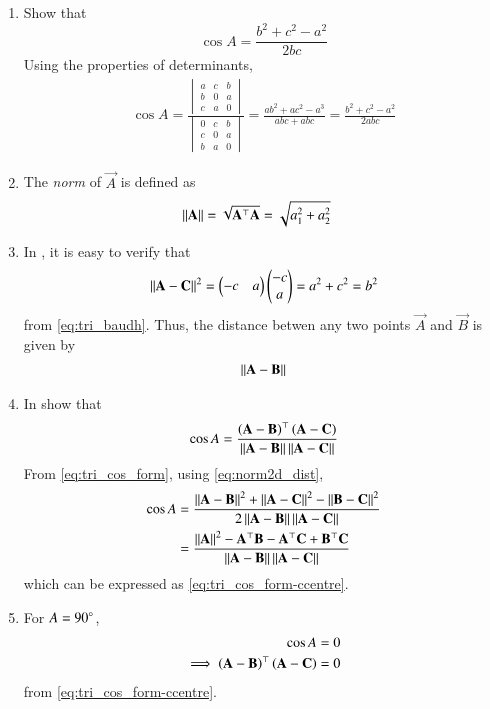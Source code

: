 \begin{enumerate}[label=\thesection.\arabic*.,ref=\thesection.\theenumi]
\item Show that 
\begin{equation}
\label{eq:tri_cos_form}
\cos A = \frac{b^2+c^2-a^2}{2bc}
\end{equation}
%
\solution 
Using the properties of determinants,
%
\begin{align}
\cos A = \frac{
\begin{vmatrix}
a & c & b \\
b & 0 & a \\
c & a & 0
\end{vmatrix}
	}
	{
\begin{vmatrix}
0 & c & b \\
c & 0 & a \\
b & a & 0
\end{vmatrix}
	}
	=\frac{ab^2 + ac^2 - a^3}{abc + abc} 
= \frac{b^2 + c^2 - a^2}{2abc}
\end{align}
\item The {\em norm} of $\vec{A}$ is defined as
\begin{align}
  \label{eq:norm2d}
	\left\lVert\mathbf{A}\right\rVert 
  &= \sqrt{\mathbf{A}^{\top} \mathbf{A}}= \sqrt{a_1^2+a_2^2}
\end{align}
\item In 
,	
it is easy to verify that 
\begin{align}
\left\lVert\mathbf{A}-\mathbf{C}\right\rVert^2  
  = \begin{pmatrix}-c & a\end{pmatrix} \begin{pmatrix}-c \\ a\end{pmatrix}
= a^2 + c^2 = b^2
\end{align}
from 
	\eqref{eq:tri_baudh}.
Thus, 
	the distance betwen any two  points $\vec{A}$ and $\vec{B}$ is given by 
\begin{align}
  \label{eq:norm2d_dist}
\left\lVert\mathbf{A}-\mathbf{B}\right\rVert 
\end{align}
  \item In 
	show that 
\begin{equation}
	\cos A= 	\frac{\left(\mathbf{A}-
	\mathbf{B}\right)^{\top}\left(\mathbf{A}-\mathbf{C}\right)}{\left\lVert\mathbf{A}-\mathbf{B}\right\rVert\left\lVert\mathbf{A}-\mathbf{C}\right\rVert}
\label{eq:tri_cos_form-ccentre}
\end{equation}
\solution
From 
\eqref{eq:tri_cos_form}, using 
  \eqref{eq:norm2d_dist},
\begin{align}
\label{eq:tri_cos_form-ccentre-norm}
	\cos A&= 	\frac{\left\lVert\mathbf{A}-\mathbf{B}\right\rVert^2+\left\lVert\mathbf{A}-\mathbf{C}\right\rVert^2-\left\lVert\mathbf{B}-\mathbf{C}\right\rVert^2}{2\left\lVert\mathbf{A}-\mathbf{B}\right\rVert\left\lVert\mathbf{A}-\mathbf{C}\right\rVert}
	\\
	&= 	\frac{\left\lVert\mathbf{A}\right\rVert^2-\mathbf{A}^{\top}\mathbf{B}-\mathbf{A}^{\top}\mathbf{C}+\mathbf{B}^{\top}\mathbf{C}}{\left\lVert\mathbf{A}-\mathbf{B}\right\rVert\left\lVert\mathbf{A}-\mathbf{C}\right\rVert}
\end{align}
which can be expressed as 
\eqref{eq:tri_cos_form-ccentre}.
\item For $A = 90 \degree$, 
\begin{align}
	\cos A&= 0
	\\
	\implies 
 	\left(\mathbf{A}-
	\mathbf{B}\right)^{\top}\left(\mathbf{A}-\mathbf{C}\right) &=0
\label{eq:tri_cos_form-orth}
\end{align}
from 
\eqref{eq:tri_cos_form-ccentre}.
\end{enumerate}
